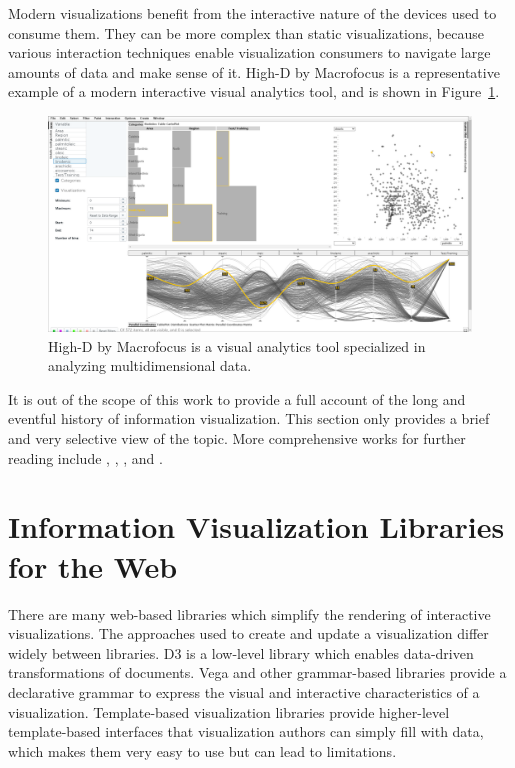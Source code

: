 Modern visualizations benefit from the interactive nature of the
devices used to consume them. They can be more complex than static
visualizations, because various interaction techniques enable
visualization consumers to navigate large amounts of data and make
sense of it. High-D by Macrofocus \parencite{HighD} is a
representative example of a modern interactive visual analytics tool,
and is shown in Figure~\ref{fig:HighD}.

\begin{figure}[tp]
\centering
\includegraphics[keepaspectratio,width=\linewidth,height=\thirdh]
{images/high-d.png}
\caption[High-D]{
High-D by Macrofocus is a visual analytics tool
specialized in analyzing multidimensional data.
}
\label{fig:HighD}
\end{figure}




It is out of the scope of this work to provide a full account of the
long and eventful history of information visualization. This section
only provides a brief and very selective view of the topic.  More
comprehensive works for further reading include
\textcite{BriefHistoryOfDataVis}, \textcite{Meirelles-2013},
\textcite{HistoryOfInformationGraphics}, and
\textcite{HistoryOfDataVisAndGraphicCommunication}.










\section{Information Visualization Libraries for the Web}

There are many web-based libraries which simplify the rendering of
interactive visualizations. The approaches used to create and update a
visualization differ widely between libraries. D3 is a low-level
library which enables data-driven transformations of documents. Vega
and other grammar-based libraries provide a declarative grammar to
express the visual and interactive characteristics of a visualization.
Template-based visualization libraries provide higher-level
template-based interfaces that visualization authors can simply fill
with data, which makes them very easy to use but can lead to
limitations.




